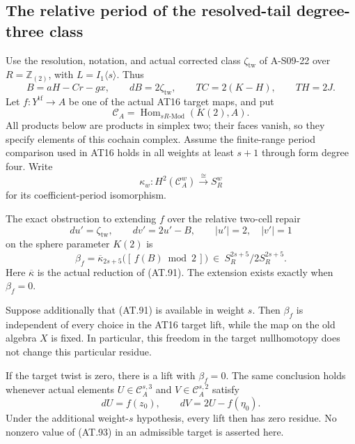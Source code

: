 \subsection{The relative period of the resolved-tail degree-three class}

\begin{proposition}
\label{AT18}
Use the resolution, notation, and actual corrected class
$\zeta_{\mathrm{tw}}$ of A-S09-22 over
$R=\mathbb Z_{(2)}$, with $L=I_1\langle s\rangle$.
Thus
\[
 B=aH-Cr-gx,\qquad dB=2\zeta_{\mathrm{tw}},
 \qquad TC=2(K-H),\qquad TH=2J.
 \tag{AT.90}
\]
Let $f:Y^{\mathrm{tf}}\to A$ be one of the actual AT16 target
maps, and put
\[
 \mathcal C_A=\operatorname{Hom}_{sR\text{-}\mathrm{Mod}}(K(2),A).
\]
All products below are products in simplex two; their faces
vanish, so they specify elements of this cochain complex.
Assume the finite-range period comparison used in AT16 holds
in all weights at least $s+1$ through form degree four.
Write
\[
 \kappa_w:H^2(\mathcal C_A^w)\xrightarrow{\;\cong\;}S_R^w
 \tag{AT.91}
\]
for its coefficient-period isomorphism.

The exact obstruction to extending $f$ over the relative two-cell
repair
\[
 du'=\zeta_{\mathrm{tw}},\qquad dv'=2u'-B,
 \qquad |u'|=2,\quad |v'|=1
 \tag{AT.92}
\]
on the sphere parameter $K(2)$ is
\[
 \beta_f=\overline\kappa_{2s+5}
             \bigl([\,f(B)\bmod2\,]\bigr)
       \ \in\ S_R^{2s+5}/2S_R^{2s+5}.
 \tag{AT.93}
\]
Here $\overline\kappa$ is the actual reduction of (AT.91).
The extension exists exactly when $\beta_f=0$.

Suppose additionally that (AT.91) is available in weight $s$.
Then $\beta_f$ is independent of every choice in the AT16
target lift, while the map on the old algebra $X$ is fixed.
In particular, this freedom in the target nullhomotopy does
not change this particular residue.

If the target twist is zero, there is a lift with $\beta_f=0$.
The same conclusion holds whenever actual elements
$U\in\mathcal C_A^{s,3}$ and $V\in\mathcal C_A^{s,2}$ satisfy
\[
               dU=f(z_0),\qquad
               dV=2U-f(\eta_0).
 \tag{AT.94}
\]
Under the additional weight-$s$ hypothesis, every lift then
has zero residue. No nonzero value of (AT.93) in an admissible
target is asserted here.
\end{proposition}

